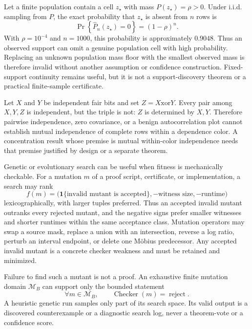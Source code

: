 \documentclass[11pt]{article}
\begin{document}

Let a finite population contain a cell \(z_\star\) with mass
\(P(z_\star)=\rho>0\).  Under i.i.d. sampling from \(P\), the exact probability that \(z_\star\) is
absent from \(n\) rows is
\[
  \Pr\!\left\{\widehat P_n(z_\star)=0\right\}=(1-\rho)^n.
  \tag{5}
\]
With \(\rho=10^{-4}\) and \(n=1000\), this probability is approximately \(0.9048\).  Thus an
observed support can omit a genuine population cell with high probability.  Replacing an unknown
population mass floor with the smallest observed mass is therefore invalid without another
assumption or confidence construction.  Fixed-support continuity remains useful, but it is not a
support-discovery theorem or a practical finite-sample certificate.


Let \(X\) and \(Y\) be independent fair bits and set \(Z=X\mathbin{\mathrm{xor}}Y\).  Every pair
among \(X,Y,Z\) is independent, but the triple is not: \(Z\) is determined by \(X,Y\).  Therefore
pairwise independence, zero covariance, or a benign autocorrelation plot cannot establish mutual
independence of complete rows within a dependence color.  A concentration result whose premise is
mutual within-color independence needs that premise justified by design or a separate theorem.


Genetic or evolutionary search can be useful when fitness is mechanically checkable.  For a
mutation \(m\) of a proof script, certificate, or implementation, a search may rank
\[
  f(m)=
  \bigl(
    \mathbf 1\{\text{invalid mutant is accepted}\},
    -\text{witness size},
    -\text{runtime}
  \bigr)
\]
lexicographically, with larger tuples preferred. Thus an accepted invalid mutant outranks every
rejected mutant, and the negative signs prefer smaller witnesses and shorter runtimes within the
same acceptance class. Mutation operators may swap a source mask, replace a union with an
intersection, reverse a log ratio, perturb an interval endpoint, or delete one Möbius predecessor.
Any accepted invalid mutant is a concrete checker weakness and must be retained and minimized.

Failure to find such a mutant is not a proof.  An exhaustive finite mutation domain
\(\mathcal M_B\) can support only the bounded statement
\[
  \forall m\in\mathcal M_B,\qquad
  \operatorname{Checker}(m)=\operatorname{reject}.
\]
A heuristic genetic run samples only part of its search space.  Its valid output is a discovered
counterexample or a diagnostic search log, never a theorem-vote or a confidence score.
\end{document}
